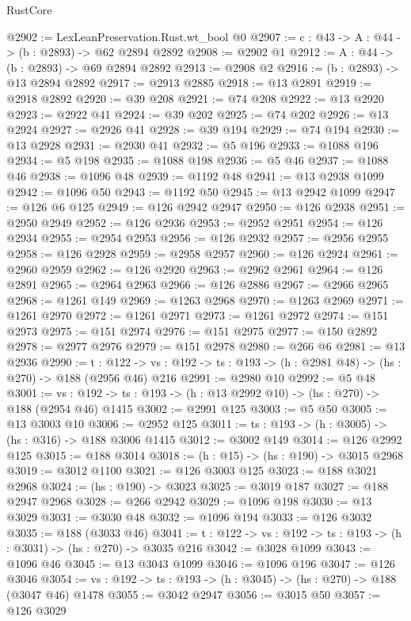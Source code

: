 \begin{lexlean}{RustCore}
\begin{coremodule}
@2902 := LexLeanPreservation.Rust.wt_bool @0
@2907 := {c : @43} -> {A : @44} -> (b : @2893) -> @62 @2894 @2892
@2908 := @2902 @1
@2912 := {A : @44} -> (b : @2893) -> @69 @2894 @2892
@2913 := @2908 @2
@2916 := (b : @2893) -> @13 @2894 @2892
@2917 := @2913 @2885
@2918 := @13 @2891
@2919 := @2918 @2892
@2920 := @39 @208
@2921 := @74 @208
@2922 := @13 @2920
@2923 := @2922 @41
@2924 := @39 @202
@2925 := @74 @202
@2926 := @13 @2924
@2927 := @2926 @41
@2928 := @39 @194
@2929 := @74 @194
@2930 := @13 @2928
@2931 := @2930 @41
@2932 := @5 @196
@2933 := @1088 @196
@2934 := @5 @198
@2935 := @1088 @198
@2936 := @5 @46
@2937 := @1088 @46
@2938 := @1096 @48
@2939 := @1192 @48
@2941 := @13 @2938 @1099
@2942 := @1096 @50
@2943 := @1192 @50
@2945 := @13 @2942 @1099
@2947 := @126 @6 @125
@2949 := @126 @2942 @2947
@2950 := @126 @2938
@2951 := @2950 @2949
@2952 := @126 @2936
@2953 := @2952 @2951
@2954 := @126 @2934
@2955 := @2954 @2953
@2956 := @126 @2932
@2957 := @2956 @2955
@2958 := @126 @2928
@2959 := @2958 @2957
@2960 := @126 @2924
@2961 := @2960 @2959
@2962 := @126 @2920
@2963 := @2962 @2961
@2964 := @126 @2891
@2965 := @2964 @2963
@2966 := @126 @2886
@2967 := @2966 @2965
@2968 := @1261 @149
@2969 := @1263 @2968
@2970 := @1263 @2969
@2971 := @1261 @2970
@2972 := @1261 @2971
@2973 := @1261 @2972
@2974 := @151 @2973
@2975 := @151 @2974
@2976 := @151 @2975
@2977 := @150 @2892
@2978 := @2977 @2976
@2979 := @151 @2978
@2980 := @266 @6
@2981 := @13 @2936
@2990 := {t : @122} ->
  {vs : @192} -> {ts : @193} -> (h : @2981 @48) -> (hs : @270) -> @188 (@2956 @46) @216
@2991 := @2980 @10
@2992 := @5 @48
@3001 := {vs : @192} -> {ts : @193} -> (h : @13 @2992 @10) -> (hs : @270) -> @188 (@2954 @46) @1415
@3002 := @2991 @125
@3003 := @5 @50
@3005 := @13 @3003 @10
@3006 := @2952 @125
@3011 := {ts : @193} -> (h : @3005) -> (hs : @316) -> @188 @3006 @1415
@3012 := @3002 @149
@3014 := @126 @2992 @125
@3015 := @188 @3014
@3018 := (h : @15) -> (hs : @190) -> @3015 @2968
@3019 := @3012 @1100
@3021 := @126 @3003 @125
@3023 := @188 @3021 @2968
@3024 := (hs : @190) -> @3023
@3025 := @3019 @187
@3027 := @188 @2947 @2968
@3028 := @266 @2942
@3029 := @1096 @198
@3030 := @13 @3029
@3031 := @3030 @48
@3032 := @1096 @194
@3033 := @126 @3032
@3035 := @188 (@3033 @46)
@3041 := {t : @122} -> {vs : @192} -> {ts : @193} -> (h : @3031) -> (hs : @270) -> @3035 @216
@3042 := @3028 @1099
@3043 := @1096 @46
@3045 := @13 @3043 @1099
@3046 := @1096 @196
@3047 := @126 @3046
@3054 := {vs : @192} -> {ts : @193} -> (h : @3045) -> (hs : @270) -> @188 (@3047 @46) @1478
@3055 := @3042 @2947
@3056 := @3015 @50
@3057 := @126 @3029

\end{coremodule}
\end{lexlean}
